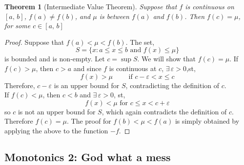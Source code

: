\documentclass{article}
\newcommand{\e}{\varepsilon}
\newcommand{\ex}{\exists\,}
\theoremstyle{mythmstyle}
\newtheorem{theorem}{Theorem}[subsection]
\begin{document}
\begin{theorem}[Intermediate Value Theorem]
  Suppose that $f$ is continuous on $[a,\, b]$, $f(a)\neq f(b)$, and $\mu$ is between $f(a)$ and $f(b)$. Then $f(c) = \mu$, for some $c\in [a,\, b]$
\end{theorem}
\begin{proof}
  Suppose that $f(a) < \mu < f(b)$. The set,
  $$ S = \{ x : a \le x \le b \text{ and }f(x)\le\mu  \} $$
  is bounded and is non-empty. Let $c = \sup S$. We will show that $f(c) = \mu$. If $f(c) > \mu$, then $c > a$ and since $f$ is continuous at $c$, $\ex\e>0$,st,
  $$ f(x) > \mu \qquad\text{ if }c - \e < x \le c $$
  Therefore, $c - \e$ is an upper bound for $S$, contradicting the definition of $c$.\\
  If $f(c) < \mu$, then $c < b$ and $\ex\e>0$, st,
  $$ f(x) < \mu \text{ for } c \le x < c + \e $$
  so $c$ is not an upper bound for $S$, which again contradicts the definition of $c$. \\
  Therefore $f(c) = \mu$. The proof for $f(b) < \mu < f(a)$ is simply obtained by applying the above to the function $-f$.
\end{proof}

\subsection{Monotonics 2: God what a mess}
\end{document}
